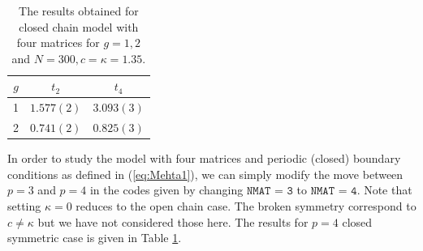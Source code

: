 \documentclass[11pt]{article}
\begin{document}
\begin{table}[h!]
	\centering
	\begin{tabular}{||c c c||} 
		\hline
		$g$ & $ t_2 $ & $t_4 $ \\ [0.5ex] 
		\hline\hline
		1 & $ 1.577(2) $ & $3.093(3)$ \\
		2 & $ 0.741(2)$ & $0.825(3) $  
		\\ [1ex] 
		\hline 
	\end{tabular}
	\caption{The results obtained for closed chain model with four matrices for $g=1,2$ and $N=300, c=\kappa=1.35$.}
	\label{table:4mchain_data}
\end{table}

In order to study the model with four matrices and periodic (closed) boundary conditions 
as defined in (\ref{eq:Mehta1}), we can simply modify the move between $p=3$ and $p=4$ in the codes given by changing $\texttt{NMAT = 3}$ to  $\texttt{NMAT = 4}$. Note that setting $\kappa=0$ reduces to the open chain case. The broken symmetry correspond to $ c \neq \kappa$ but we have not considered those here. The results for $p=4$ closed symmetric case is given in Table \ref{table:4mchain_data}. 

\end{document}
